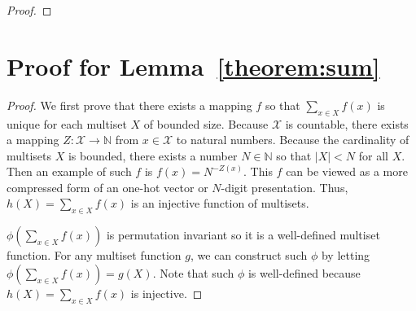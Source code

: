 \begin{appendix}
\begin{proof}
\end{proof}


\section{Proof for Lemma~\ref{theorem:sum}} \label{proof:sum}

\begin{proof}
We first prove that there exists a mapping $f$ so that $\sum\limits_{x \in X} f(x)$ is unique for each multiset $X$ of bounded size. Because $\mathcal{X}$ is countable, there exists a mapping $Z: \mathcal{X} \rightarrow \mathbb{N}$ from $x \in \mathcal{X}$ to natural numbers. Because the cardinality of multisets $X$ is bounded, there exists a number $N \in \mathbb{N}$ so that $|X| < N$ for all $X$. Then an example of such $f$ is $f(x) =N^{-Z(x)}$. This $f$ can be viewed as a more compressed form of an one-hot vector or $N$-digit presentation. Thus, $h(X) =  \sum\limits_{x \in X} f(x)$ is an injective function of multisets. 

$\phi \left( \sum_{x \in X} f(x) \right)$ is permutation invariant so it is a well-defined multiset function. For any multiset function $g$, we can construct such $\phi$ by letting $\phi \left( \sum_{x \in X} f(x) \right) = g(X)$. Note that such $\phi$ is well-defined because $h(X) =  \sum\limits_{x \in X} f(x)$ is injective. 

\end{proof}



\end{appendix}
